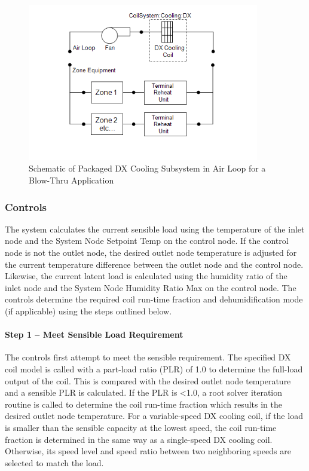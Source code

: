 \begin{figure}[hbtp] %
\centering
\includegraphics[width=0.9\textwidth, height=0.9\textheight, keepaspectratio=true]{media/image5198.png}
\caption{Schematic of Packaged DX Cooling Subsystem in Air Loop for a Blow-Thru Application \protect \label{fig:schematic-of-packaged-dx-cooling-subsystem-in}}
\end{figure}

\subsubsection{Controls}\label{controls-1}

The system calculates the current sensible load using the temperature of the inlet node and the System Node Setpoint Temp on the control node. If the control node is not the outlet node, the desired outlet node temperature is adjusted for the current temperature difference between the outlet node and the control node. Likewise, the current latent load is calculated using the humidity ratio of the inlet node and the System Node Humidity Ratio Max on the control node. The controls determine the required coil run-time fraction and dehumidification mode (if applicable) using the steps outlined below.

\paragraph{Step 1 -- Meet Sensible Load Requirement}\label{step-1-meet-sensible-load-requirement-1}

The controls first attempt to meet the sensible requirement. The specified DX coil model is called with a part-load ratio (PLR) of 1.0 to determine the full-load output of the coil. This is compared with the desired outlet node temperature and a sensible PLR is calculated. If the PLR is \textless{}1.0, a root solver iteration routine is called to determine the coil run-time fraction which results in the desired outlet node temperature. For a variable-speed DX cooling coil, if the load is smaller than the sensible capacity at the lowest speed, the coil run-time fraction is determined in the same way as a single-speed DX cooling coil. Otherwise, its speed level and speed ratio between two neighboring speeds are selected to match the load.

